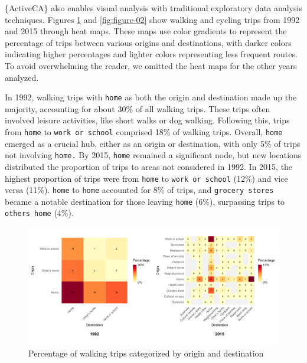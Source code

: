 \documentclass[Royal,times,sageh]{sagej}
\begin{document}
\{ActiveCA\} also enables visual analysis with traditional exploratory
data analysis techniques. Figures \ref{fig:figure-01} and
\ref{fig:figure-02} show walking and cycling trips from 1992 and 2015
through heat maps. These maps use color gradients to represent the
percentage of trips between various origins and destinations, with
darker colors indicating higher percentages and lighter colors
representing less frequent routes. To avoid overwhelming the reader, we
omitted the heat maps for the other years analyzed.

In 1992, walking trips with \texttt{home} as both the origin and
destination made up the majority, accounting for about 30\% of all
walking trips. These trips often involved leisure activities, like short
walks or dog walking. Following this, trips from \texttt{home} to
\texttt{work\ or\ school} comprised 18\% of walking trips. Overall,
\texttt{home} emerged as a crucial hub, either as an origin or
destination, with only 5\% of trips not involving \texttt{home.} By
2015, \texttt{home} remained a significant node, but new locations
distributed the proportion of trips to areas not considered in 1992. In
2015, the highest proportion of trips were from \texttt{home} to
\texttt{work\ or\ school} (12\%) and vice versa (11\%). \texttt{home} to
\texttt{home} accounted for 8\% of trips, and \texttt{grocery\ stores}
became a notable destination for those leaving \texttt{home} (6\%),
surpassing trips to \texttt{other\textquotesingle{}s\ home} (4\%).

\begin{figure}

{\centering \includegraphics[width=1\linewidth]{Manuscript-figures/walking_hm_fig} 

}

\caption{Percentage of walking trips categorized by origin and destination}\label{fig:figure-01}
\end{figure}
\end{document}
